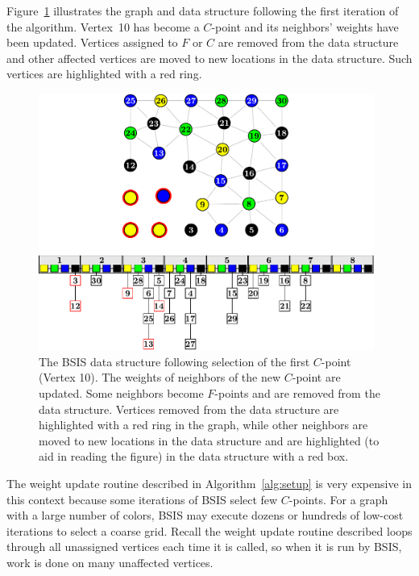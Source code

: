 \documentclass{elsart}
\begin{document}
Figure~\ref{5:fig:bucket-algorithm-cp1} illustrates the graph and data
structure following the first iteration of the algorithm. Vertex~10
has become a $C$-point and its neighbors' weights have been
updated. Vertices assigned to $F$ or $C$ are removed from the data
structure and other affected vertices are moved to new locations in
the data structure. Such vertices are highlighted with a red ring.
\begin{figure}
  \begin{center}
    \includegraphics[width=0.98\textwidth]{images/BSIS/cp1}
    \caption{The BSIS data structure following selection of the first
    $C$-point (Vertex 10). The weights of neighbors of the new
    $C$-point are updated. Some neighbors become $F$-points and are
    removed from the data structure. Vertices removed from the data
    structure are highlighted with a red ring in the graph, while
    other neighbors are moved to new locations in the data structure
    and are highlighted (to aid in reading the figure) in the data
    structure with a red box.}
    \label{5:fig:bucket-algorithm-cp1}
  \end{center}
\end{figure}

The weight update routine described in Algorithm~\ref{alg:setup} is
very expensive in this context because some iterations of BSIS select
few $C$-points. For a graph with a large number of colors, BSIS may
execute dozens or hundreds of low-cost iterations to select a coarse
grid. Recall the weight update routine described loops through all
unassigned vertices each time it is called, so when it is run by BSIS,
work is done on many unaffected vertices.
\end{document}
